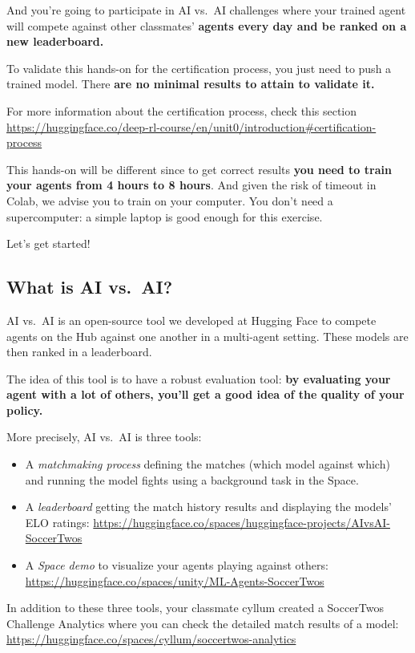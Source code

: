 \documentclass[11pt,a4paper]{article}
\begin{document}
And you're going to participate in AI vs.~AI challenges where your trained agent will compete against other classmates' \textbf{agents every day and be ranked on a new leaderboard.}

To validate this hands-on for the certification process, you just need to push a trained model. There \textbf{are no minimal results to attain to validate it.}

For more information about the certification process, check this section \url{https://huggingface.co/deep-rl-course/en/unit0/introduction\#certification-process}

This hands-on will be different since to get correct results \textbf{you need to train your agents from 4 hours to 8 hours}. And given the risk of timeout in Colab, we advise you to train on your computer. You don't need a supercomputer: a simple laptop is good enough for this exercise.

Let's get started!

\subsection{What is AI vs.~AI?}\label{what-is-ai-vs.-ai}

AI vs.~AI is an open-source tool we developed at Hugging Face to compete agents on the Hub against one another in a multi-agent setting. These models are then ranked in a leaderboard.

The idea of this tool is to have a robust evaluation tool: \textbf{by evaluating your agent with a lot of others, you'll get a good idea of the quality of your policy.}

More precisely, AI vs.~AI is three tools:

\begin{itemize}
\tightlist
\item
  A \emph{matchmaking process} defining the matches (which model against which) and running the model fights using a background task in the Space.
\item
  A \emph{leaderboard} getting the match history results and displaying the models' ELO ratings: \url{https://huggingface.co/spaces/huggingface-projects/AIvsAI-SoccerTwos}
\item
  A \emph{Space demo} to visualize your agents playing against others: \url{https://huggingface.co/spaces/unity/ML-Agents-SoccerTwos}
\end{itemize}

In addition to these three tools, your classmate cyllum created a SoccerTwos Challenge Analytics where you can check the detailed match results of a model: \url{https://huggingface.co/spaces/cyllum/soccertwos-analytics}
\end{document}
